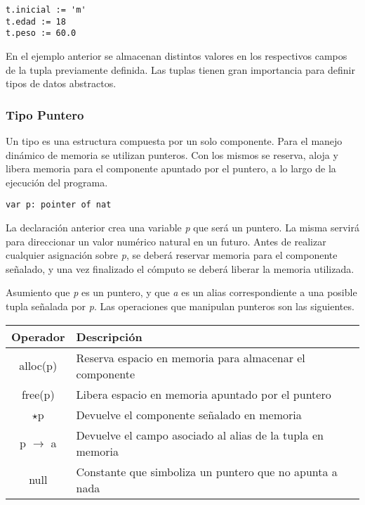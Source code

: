 \documentclass{article}
\begin{document}
\begin{lstlisting}
t.inicial := 'm'
t.edad := 18
t.peso := 60.0
\end{lstlisting}

En el ejemplo anterior se almacenan distintos valores en los respectivos campos de la tupla previamente definida.
Las tuplas tienen gran importancia para definir tipos de datos abstractos.

\subsubsection{Tipo Puntero}

Un tipo  es una estructura compuesta por un solo componente.
Para el manejo dinámico de memoria se utilizan punteros.
Con los mismos se reserva, aloja y libera memoria para el componente apuntado por el puntero, a lo largo de la ejecución del programa.

\begin{lstlisting}
var p: pointer of nat
\end{lstlisting}

La declaración anterior crea una variable \textit{p} que será un puntero.
La misma servirá para direccionar un valor numérico natural en un futuro.
Antes de realizar cualquier asignación sobre \textit{p}, se deberá reservar memoria para el componente señalado, y una vez finalizado el cómputo se deberá liberar la memoria utilizada.

Asumiento que \textit{p} es un puntero, y que \textit{a} es un alias correspondiente a una posible tupla señalada por \textit{p}.
Las operaciones que manipulan punteros son las siguientes.

\begin{center}
\begin{tabular}{| c | l |}
\hline
     Operador & Descripción  \\
     \hline
     alloc(p) & Reserva espacio en memoria para almacenar el componente \\
     free(p) & Libera espacio en memoria apuntado por el puntero \\
     $\star$p & Devuelve el componente señalado en memoria \\
     p $\rightarrow$ a & Devuelve el campo asociado al alias de la tupla en memoria \\
     null & Constante que simboliza un puntero que no apunta a nada \\
\hline
\end{tabular}
\end{center}
\end{document}
